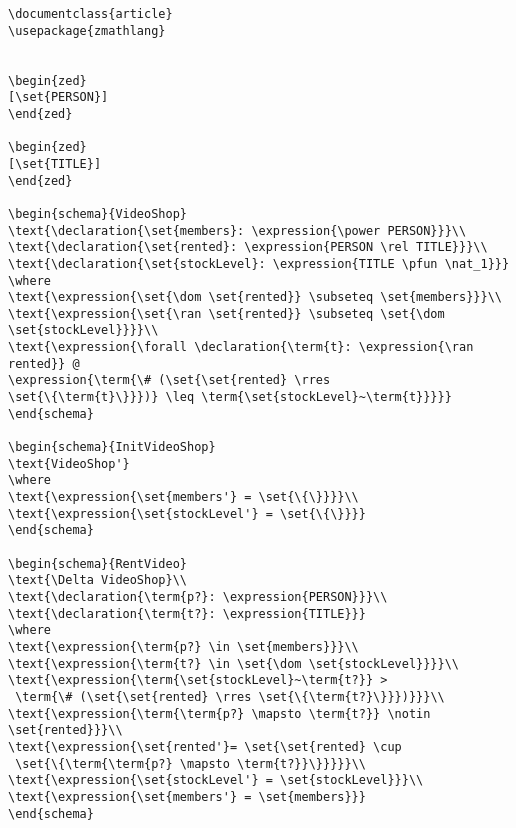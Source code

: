 \begin{verbatim}
\documentclass{article}
\usepackage{zmathlang}


\begin{zed}
[\set{PERSON}]
\end{zed}

\begin{zed}
[\set{TITLE}]
\end{zed}

\begin{schema}{VideoShop}
\text{\declaration{\set{members}: \expression{\power PERSON}}}\\
\text{\declaration{\set{rented}: \expression{PERSON \rel TITLE}}}\\
\text{\declaration{\set{stockLevel}: \expression{TITLE \pfun \nat_1}}}
\where
\text{\expression{\set{\dom \set{rented}} \subseteq \set{members}}}\\
\text{\expression{\set{\ran \set{rented}} \subseteq \set{\dom \set{stockLevel}}}}\\
\text{\expression{\forall \declaration{\term{t}: \expression{\ran rented}} @
\expression{\term{\# (\set{\set{rented} \rres 
\set{\{\term{t}\}}})} \leq \term{\set{stockLevel}~\term{t}}}}}
\end{schema}

\begin{schema}{InitVideoShop}
\text{VideoShop'}
\where
\text{\expression{\set{members'} = \set{\{\}}}}\\
\text{\expression{\set{stockLevel'} = \set{\{\}}}}
\end{schema}

\begin{schema}{RentVideo}
\text{\Delta VideoShop}\\
\text{\declaration{\term{p?}: \expression{PERSON}}}\\
\text{\declaration{\term{t?}: \expression{TITLE}}}
\where
\text{\expression{\term{p?} \in \set{members}}}\\
\text{\expression{\term{t?} \in \set{\dom \set{stockLevel}}}}\\
\text{\expression{\term{\set{stockLevel}~\term{t?}} >
 \term{\# (\set{\set{rented} \rres \set{\{\term{t?}\}}})}}}\\
\text{\expression{\term{\term{p?} \mapsto \term{t?}} \notin \set{rented}}}\\
\text{\expression{\set{rented'}= \set{\set{rented} \cup
 \set{\{\term{\term{p?} \mapsto \term{t?}}\}}}}}\\
\text{\expression{\set{stockLevel'} = \set{stockLevel}}}\\
\text{\expression{\set{members'} = \set{members}}}
\end{schema}


\end{verbatim}
